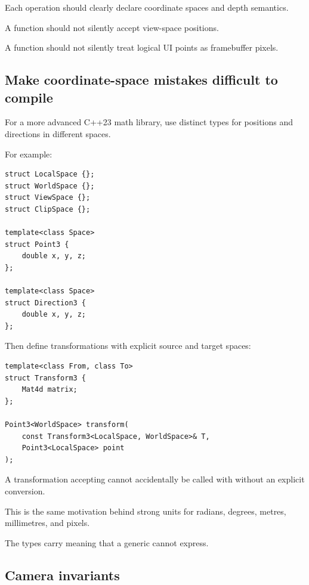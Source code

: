 Each operation should clearly declare coordinate spaces and depth semantics.

A  function should not silently accept view-space positions.

A  function should not silently treat logical UI points as framebuffer pixels.

\subsection{Make coordinate-space mistakes difficult to compile}\label{02-foundations-ii-ch037-make-coordinate-space-mistakes-difficult-to-compile}

\hypertarget{02-foundations-ii-ch037-make-coordinate-space-mistakes-difficult-to-compile}{}

For a more advanced C++23 math library, use distinct types for positions and directions in different spaces.

For example:

\begin{verbatim}
struct LocalSpace {};
struct WorldSpace {};
struct ViewSpace {};
struct ClipSpace {};

template<class Space>
struct Point3 {
    double x, y, z;
};

template<class Space>
struct Direction3 {
    double x, y, z;
};
\end{verbatim}

Then define transformations with explicit source and target spaces:

\begin{verbatim}
template<class From, class To>
struct Transform3 {
    Mat4d matrix;
};

Point3<WorldSpace> transform(
    const Transform3<LocalSpace, WorldSpace>& T,
    Point3<LocalSpace> point
);
\end{verbatim}

A transformation accepting  cannot accidentally be called with  without an explicit conversion.

This is the same motivation behind strong units for radians, degrees, metres, millimetres, and pixels.

The types carry meaning that a generic  cannot express.

\subsection{Camera invariants}\label{02-foundations-ii-ch037-camera-invariants}

